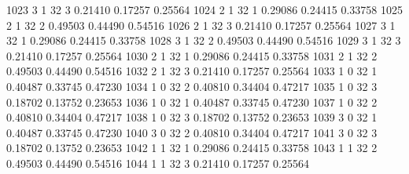 \documentclass{article}
\begin{document}
\begin{Woutput}
1023      3       1      32       3       0.21410    0.17257    0.25564
1024      2       1      32       1       0.29086    0.24415    0.33758
1025      2       1      32       2       0.49503    0.44490    0.54516
1026      2       1      32       3       0.21410    0.17257    0.25564
1027      3       1      32       1       0.29086    0.24415    0.33758
1028      3       1      32       2       0.49503    0.44490    0.54516
1029      3       1      32       3       0.21410    0.17257    0.25564
1030      2       1      32       1       0.29086    0.24415    0.33758
1031      2       1      32       2       0.49503    0.44490    0.54516
1032      2       1      32       3       0.21410    0.17257    0.25564
1033      1       0      32       1       0.40487    0.33745    0.47230
1034      1       0      32       2       0.40810    0.34404    0.47217
1035      1       0      32       3       0.18702    0.13752    0.23653
1036      1       0      32       1       0.40487    0.33745    0.47230
1037      1       0      32       2       0.40810    0.34404    0.47217
1038      1       0      32       3       0.18702    0.13752    0.23653
1039      3       0      32       1       0.40487    0.33745    0.47230
1040      3       0      32       2       0.40810    0.34404    0.47217
1041      3       0      32       3       0.18702    0.13752    0.23653
1042      1       1      32       1       0.29086    0.24415    0.33758
1043      1       1      32       2       0.49503    0.44490    0.54516
1044      1       1      32       3       0.21410    0.17257    0.25564


\end{Woutput}
\end{document}

